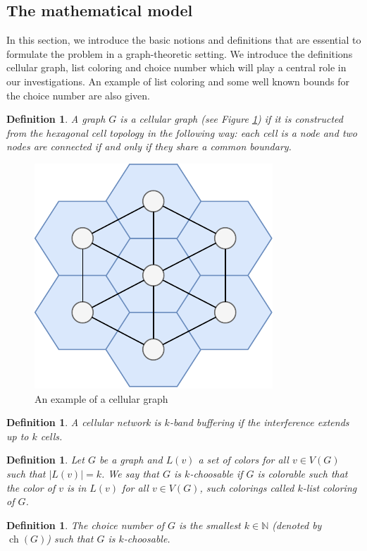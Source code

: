 \documentclass[a4paper, 12pt]{article}
\newtheorem{defin}[lem]{Definition}
\DeclareMathOperator*{\ch}{ch}
\begin{document}
\subsection{The mathematical model}\label{sec:math-model}
In this section, we introduce the basic notions and definitions that are essential to formulate the problem in a graph-theoretic setting. We introduce the definitions cellular graph, list coloring and choice number which will play a central role in our investigations. An example of list coloring and some well known bounds for the choice number are also given.
\begin{defin} A graph $G$ is a  \textit{cellular graph} (see Figure \ref{fig:cellular-graph}) if it is constructed from the hexagonal cell topology in the following way: each cell is a node and two nodes are connected if and only if they share a common boundary.
\end{defin}
\begin{figure}[!h]
\centering
\includegraphics[scale=1]{figures/cellular-graph.pdf}
\caption{An example of a cellular graph}\label{fig:cellular-graph}
\end{figure}
\begin{defin} A cellular network is $k$\textit{-band buffering} if the interference extends up to $k$ cells.
\end{defin}
\begin{defin} Let $G$ be a graph and $L(v)$ a set of colors for all $v \in V(G)$ such that $|L(v)|=k$. We say that $G$ is $k$\textit{-choosable} if $G$ is colorable such that the color of $v$ is in $L(v)$ for all $v \in V(G)$, such colorings called $k$\textit{-list coloring} of $G$.
\end{defin}
\begin{defin} The \textit{choice number} of $G$ is the smallest $k \in \mathbb{N}$ (denoted by $\ch(G)$) such that $G$ is $k$-choosable.
\end{defin}
\end{document}
